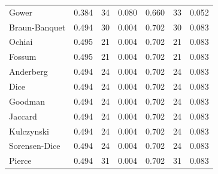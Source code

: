 \begin{table}[t]
{\begin{tabular}{lrrrrrr}
Gower & 0.384 & 34 & 0.080 & 0.660 & 33 & 0.052 \\
Braun-Banquet & 0.494 & 30 & 0.004 & 0.702 & 30 & 0.083 \\
Ochiai & 0.495 & 21 & 0.004 & 0.702 & 21 & 0.083 \\
Fossum & 0.495 & 21 & 0.004 & 0.702 & 21 & 0.083 \\
Anderberg & 0.494 & 24 & 0.004 & 0.702 & 24 & 0.083 \\
Dice & 0.494 & 24 & 0.004 & 0.702 & 24 & 0.083 \\
Goodman & 0.494 & 24 & 0.004 & 0.702 & 24 & 0.083 \\
Jaccard & 0.494 & 24 & 0.004 & 0.702 & 24 & 0.083 \\
Kulczynski & 0.494 & 24 & 0.004 & 0.702 & 24 & 0.083 \\
Sorensen-Dice & 0.494 & 24 & 0.004 & 0.702 & 24 & 0.083 \\
Pierce & 0.494 & 31 & 0.004 & 0.702 & 31 & 0.083 \\
\bottomrule
\end{tabular}
}
\end{table}

